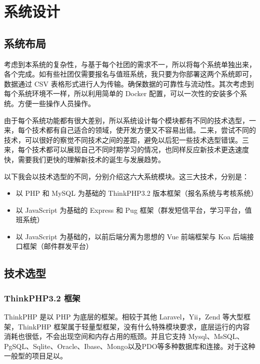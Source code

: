 \chapter{系统设计}
\label{cha:system-design}

\section{系统布局}
\label{sec:system-layout}

考虑到本系统的复杂性，与基于每个社团的需求不一，所以将每个系统单独出来，各个完成。如有些社团仅需要报名与值班系统，我只要为你部署这两个系统即可，数据通过 CSV 表格形式进行人为传输。确保数据的可靠性与流动性。其次考虑到每个系统环境不一样，所以利用简单的 Docker 配置，可以一次性的安装多个系统。方便一些操作人员操作。

由于每个系统功能都有很大差别，所以系统设计每个模块都有不同的技术选型，一来，每个技术都有自己适合的领域，使开发方便又不容易出错。二来，尝试不同的技术，可以很好的察觉不同技术之间的差距，避免以后犯一些技术选型错误。三来，每个技术都可以展现自己不同时期学习的情况，也同样反应新技术更迭速度快，需要我们更快的理解新技术的诞生与发展趋势。

以下我会以技术选型的不同，分别介绍这六大系统模块。这三大技术，分别是：
\begin{itemize}
  \item 以 PHP 和 MySQL 为基础的 ThinkPHP3.2 版本框架（报名系统与考核系统）
  \item 以 JavaScript 为基础的 Express 和 Pug 框架（群发短信平台，学习平台，值班系统）
  \item 以 JavaScript 为基础的，以前后端分离为思想的 Vue 前端框架与 Koa 后端接口框架（邮件群发平台）
\end{itemize}

\section{技术选型}
\label{sec:technical-selection}

\subsection{ThinkPHP3.2 框架}

ThinkPHP
\cite{thinkphp}
 是以 PHP 为底层的框架。相较于其他 Laravel，Yii，Zend 等大型框架，ThinkPHP 框架属于轻量型框架，没有什么特殊模块要求，底层运行的内容消耗也很低，不会出现空间和内存占用的瓶颈。并且它支持 Mysql、MsSQL、PgSQL、Sqlite、Oracle、Ibase、Mongo以及PDO等多种数据库和连接。对于这种一般型的项目足以。

